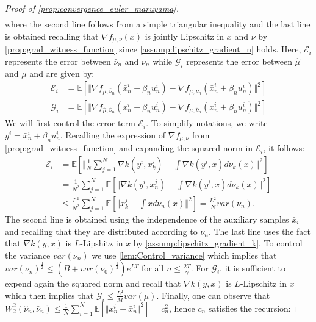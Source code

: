 \begin{proof}[Proof of \cref{prop:convergence_euler_maruyama}]
\begin{align*}
\end{align*}
where the second line follows from a simple triangular inequality and the last line is obtained recalling that $\nabla f_{\mu,\nu}(x)$
is jointly Lipschitz in $x$ and $\nu$ by \cref{prop:grad_witness_function} since \cref{assump:lipschitz_gradient_n} holds. Here, $\mathcal{E}_{i}$ represents the error between $\bar{\nu}_n$ and $\nu_n$ while $\mathcal{G}_{i}$  represents the error between $\hat{\mu}$ and $\mu$ and are given by: 
\begin{align*}
\mathcal{E}_{i} & =\mathbb{E}[\Vert\nabla f_{\mu,\bar{\nu}_{n}}(\bar{x}_{n}^{i}+\beta_{n}u_{n}^{i})-\nabla f_{\mu,\nu_{n}}(\bar{x}_{n}^{i}+\beta_{n}u_{n}^{i})\Vert^{2}]\\
\mathcal{G}_{i} & =\mathbb{E}[\Vert\nabla f_{\hat{\mu},\hat{\nu}_{n}}(x_{n}^{i}+\beta_{n}u_{n}^{i})-\nabla f_{\mu,\hat{\nu}_{n}}(x_{n}^{i}+\beta_{n}u_{n}^{i})\Vert^{2}]
\end{align*}
We will first control the error term $\mathcal{E}_i$. To simplify
notations, we write $y^{i}=\bar{x}_{n}^{i}+\beta_{n}u_{n}^{i}$. Recalling the expression of $\nabla f_{\mu,\nu}$ from \cref{prop:grad_witness_function} and expanding the squared norm in $\mathcal{E}_i$, it follows:
\begin{align*}
\mathcal{E}_{i} & =\mathbb{E}[\Vert\frac{1}{N}\sum_{j=1}^{N}\nabla k(y^{i},\bar{x}_{k}^{j})-\int\nabla k(y^{i},x)d\nu_{k}(x)\Vert^{2}]\\
 & =\frac{1}{N^{2}}\sum_{j=1}^{N}\mathbb{E}\left[\Vert\nabla k(y^{i},\bar{x}_{n}^{j})-\int\nabla k(y^{i},x)d\nu_{k}(x)\Vert^{2}\right]\\
 & \leq\frac{L^{2}}{N^{2}}\sum_{j=1}^{N}\mathbb{E}[\Vert\bar{x}_{k}^{j}-\int xd\nu_{n}(x)\Vert^{2}]=\frac{L^{2}}{N}var(\nu_{n}).
\end{align*}
The second line is obtained using the independence of the auxiliary samples $\bar{x}_{i}$ and recalling that they are distributed according to $\nu_{n}$. The last line uses the fact that $\nabla k(y,x)$ is $L$-Lipshitz in $x$ by \cref{assump:lipschitz_gradient_k}. To control the variance $var(\nu_n)$ we use  \cref{lem:Control_variance} which implies that $var(\nu_{n})^{\frac{1}{2}}\leq(B+var(\nu_{0})^{\frac{1}{2}})e^{LT}$ for all $n\leq\frac{2T}{\gamma}$.
For $\mathcal{G}_{i}$, it is sufficient to expend again the squared norm and recall that $\nabla k(y,x)$ is $L$-Lipschitz in $x$ which then implies that $\mathcal{G}_{i}\leq\frac{L^{2}}{M}var(\mu)$. Finally, one can observe that  $W_{2}^{2}(\hat{\nu}_{n},\bar{\nu}_{n})\leq\frac{1}{N}\sum_{i=1}^{N}\mathbb{E}\left[\Vert x_{n}^{i}-\bar{x}_{n}^{i}\Vert^{2}\right]=c_{n}^{2}$, hence $c_n$ satisfies the recursion:

\end{proof}
